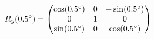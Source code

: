 \documentclass[preview]{standalone}
\begin{document}
\begin{align*}
\special{dvisvgm:raw <g id='unique000'>}R_y(0.5^\circ) = \begin{pmatrix} \cos(0.5^\circ) & 0 & -\sin(0.5^\circ) \\ 0 & 1 & 0 \\ \sin(0.5^\circ) & 0 & \cos(0.5^\circ) \end{pmatrix}\special{dvisvgm:raw </g>}
\end{align*}
\end{document}
